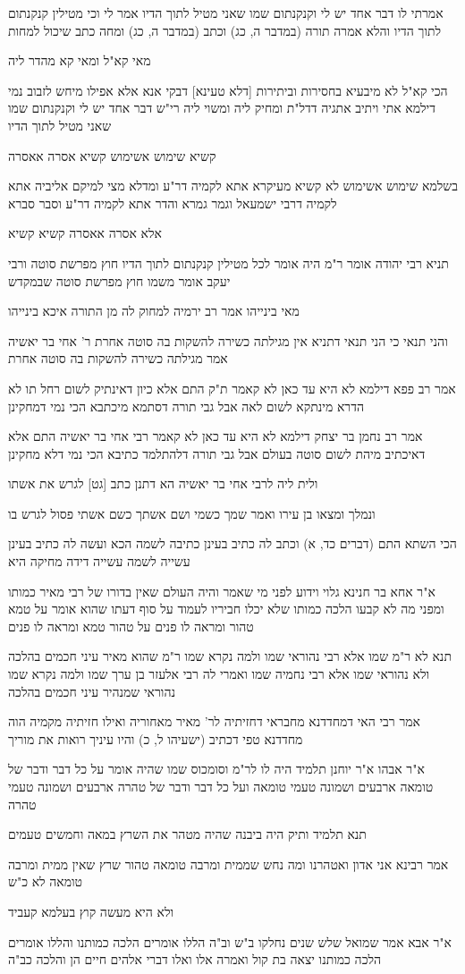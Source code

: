 \documentclass[12pt, openany]{book}
\newcommand{\sethebfont}{
\fontsize{10.5pt}{21.0pt} \selectfont
}
\newcommand{\textblock}[1]{
{\sethebfont #1\\}	
}
\begin{document}
\textblock{אמרתי לו דבר אחד יש לי וקנקנתום שמו שאני מטיל לתוך הדיו אמר לי וכי מטילין קנקנתום לתוך הדיו והלא אמרה תורה (במדבר ה, כג) וכתב (במדבר ה, כג) ומחה כתב שיכול למחות}
\textblock{מאי קא"ל ומאי קא מהדר ליה}
\textblock{הכי קא"ל לא מיבעיא בחסירות וביתירות [דלא טעינא] דבקי אנא אלא אפילו מיחש לזבוב נמי דילמא אתי ויתיב אתגיה דדל"ת ומחיק ליה ומשוי ליה רי"ש דבר אחד יש לי וקנקנתום שמו שאני מטיל לתוך הדיו}
\textblock{קשיא שימוש אשימוש קשיא אסרה אאסרה}
\textblock{בשלמא שימוש אשימוש לא קשיא מעיקרא אתא לקמיה דר"ע ומדלא מצי למיקם אליביה אתא לקמיה דרבי ישמעאל וגמר גמרא והדר אתא לקמיה דר"ע וסבר סברא}
\textblock{אלא אסרה אאסרה קשיא קשיא}
\textblock{תניא רבי יהודה אומר ר"מ היה אומר לכל מטילין קנקנתום לתוך הדיו חוץ מפרשת סוטה ורבי יעקב אומר משמו חוץ מפרשת סוטה שבמקדש}
\textblock{מאי בינייהו אמר רב ירמיה למחוק לה מן התורה איכא בינייהו}
\textblock{והני תנאי כי הני תנאי דתניא אין מגילתה כשירה להשקות בה סוטה אחרת ר' אחי בר יאשיה אמר מגילתה כשירה להשקות בה סוטה אחרת}
\textblock{אמר רב פפא דילמא לא היא עד כאן לא קאמר ת"ק התם אלא כיון דאינתיק לשום רחל תו לא הדרא מינתקא לשום לאה אבל גבי תורה דסתמא מיכתבא הכי נמי דמחקינן}
\textblock{אמר רב נחמן בר יצחק דילמא לא היא עד כאן לא קאמר רבי אחי בר יאשיה התם אלא דאיכתיב מיהת לשום סוטה בעולם אבל גבי תורה דלהתלמד כתיבא הכי נמי דלא מחקינן}
\textblock{ולית ליה לרבי אחי בר יאשיה הא דתנן כתב [גט] לגרש את אשתו}
\textblock{ונמלך ומצאו בן עירו ואמר שמך כשמי ושם אשתך כשם אשתי פסול לגרש בו}
\textblock{הכי השתא התם (דברים כד, א) וכתב לה כתיב בעינן כתיבה לשמה הכא ועשה לה כתיב בעינן עשייה לשמה עשייה דידה מחיקה היא}
\textblock{א"ר אחא בר חנינא גלוי וידוע לפני מי שאמר והיה העולם שאין בדורו של רבי מאיר כמותו ומפני מה לא קבעו הלכה כמותו שלא יכלו חביריו לעמוד על סוף דעתו שהוא אומר על טמא טהור ומראה לו פנים על טהור טמא ומראה לו פנים}
\textblock{תנא לא ר"מ שמו אלא רבי נהוראי שמו ולמה נקרא שמו ר"מ שהוא מאיר עיני חכמים בהלכה ולא נהוראי שמו אלא רבי נחמיה שמו ואמרי לה רבי אלעזר בן ערך שמו ולמה נקרא שמו נהוראי שמנהיר עיני חכמים בהלכה}
\textblock{אמר רבי האי דמחדדנא מחבראי דחזיתיה לר' מאיר מאחוריה ואילו חזיתיה מקמיה הוה מחדדנא טפי דכתיב (ישעיהו ל, כ) והיו עיניך רואות את מוריך}
\textblock{א"ר אבהו א"ר יוחנן תלמיד היה לו לר"מ וסומכוס שמו שהיה אומר על כל דבר ודבר של טומאה ארבעים ושמונה טעמי טומאה ועל כל דבר ודבר של טהרה ארבעים ושמונה טעמי טהרה}
\textblock{תנא תלמיד ותיק היה ביבנה שהיה מטהר את השרץ במאה וחמשים טעמים}
\textblock{אמר רבינא אני אדון ואטהרנו ומה נחש שממית ומרבה טומאה טהור שרץ שאין ממית ומרבה טומאה לא כ"ש}
\textblock{ולא היא מעשה קוץ בעלמא קעביד}
\textblock{א"ר אבא אמר שמואל שלש שנים נחלקו ב"ש וב"ה הללו אומרים הלכה כמותנו והללו אומרים הלכה כמותנו  יצאה בת קול ואמרה אלו ואלו דברי אלהים חיים הן והלכה כב"ה}
\end{document}
